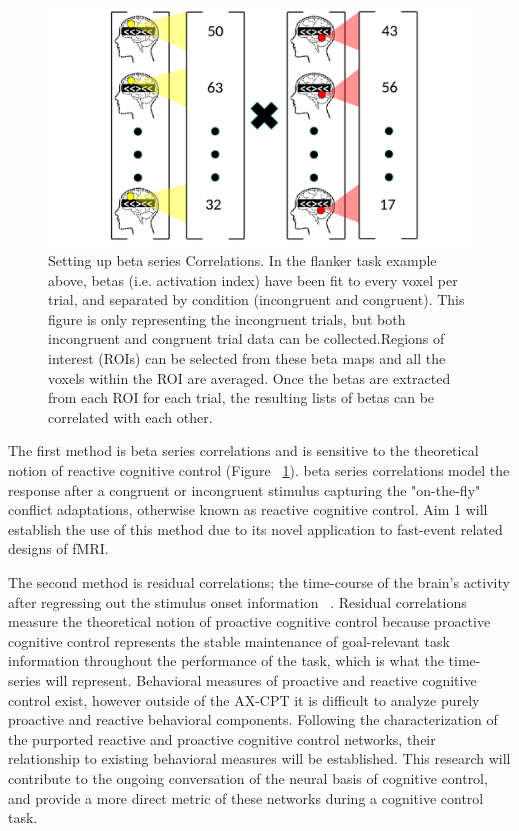 \documentclass[phd,appendix,figures]{uithesis}
\begin{document}
\begin{figure}[H]%
    \centering
    \includegraphics[scale=0.25]{betaseries_correlation_illustration}
    \caption{Setting up beta series Correlations. In the flanker task example above, betas (i.e. activation index) have been fit to every voxel per trial, and separated by condition (incongruent and congruent). This figure is only representing the incongruent trials, but both incongruent and congruent trial data can be collected.Regions of interest (ROIs) can be selected from these beta maps and all the voxels within the ROI are averaged. Once the betas are extracted from each ROI for each trial, the resulting lists of betas can be correlated with each other.}%
    \label{fig:betaseries_correlation_illustration}%
\end{figure}

The first method is beta series correlations and is sensitive to the theoretical notion of reactive cognitive control (Figure ~\ref{fig:betaseries_correlation_illustration}). 
beta series correlations model the response after a congruent or incongruent stimulus capturing the "on-the-fly" conflict adaptations, otherwise known as reactive cognitive control.
Aim 1 will establish the use of this method due to its novel application to fast-event related designs of fMRI.

The second method is residual correlations; the time-course of the brain's activity after regressing out the stimulus onset information ~\citep{Fair2007,Cole2014,Bolt2017}. 
Residual correlations measure the theoretical notion of proactive cognitive control because proactive cognitive control represents the stable maintenance of goal-relevant task information throughout the performance of the task, which is what the time-series will represent.
Behavioral measures of proactive and reactive cognitive control exist, however outside of the AX-CPT it is difficult to analyze purely proactive and reactive behavioral components. 
Following the characterization of the purported reactive and proactive cognitive control networks, their relationship to existing behavioral measures will be established.
This research will contribute to the ongoing conversation of the neural basis of cognitive control, and provide a more direct metric of these networks during a  cognitive control task.
\end{document}
